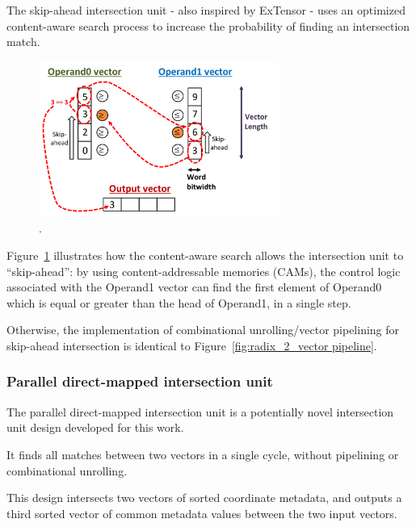 The skip-ahead intersection unit - also inspired by ExTensor\cite{extensor} - uses an optimized content-aware search process to increase the probability of finding an intersection match.

\begin{figure}[ht]
\centering
\includegraphics[width=0.7\textwidth]{figures/skip_ahead_dia.pdf}
\caption{.}
\label{fig:skip_ahead_dia}
\end{figure}

Figure~\ref{fig:skip_ahead_dia} illustrates how the content-aware search allows the intersection unit to ``skip-ahead'': by using content-addressable memories (CAMs), the control logic associated with the Operand1 vector can find the first element of Operand0 which is equal or greater than the head of Operand1, in a single step. 

Otherwise, the implementation of combinational unrolling/vector pipelining for skip-ahead intersection is identical to Figure~\ref{fig:radix_2_vector pipeline}.

\subsubsection{Parallel direct-mapped intersection unit}

The parallel direct-mapped intersection unit is a potentially novel intersection unit design developed for this work.

It finds all matches between two vectors in a single cycle, without pipelining or combinational unrolling.

This design intersects two vectors of sorted coordinate metadata, and outputs a third sorted vector of common metadata values between the two input vectors. 

\clearpage

